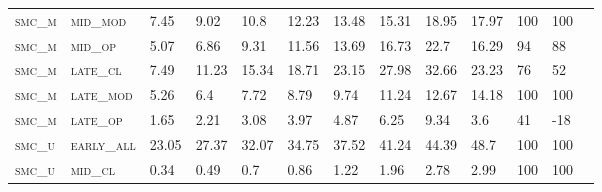 \begin{sidewaystable}[!htbp]
\begin{tabular}{@{}lllllllllllll@{}}
\footnotesize \textsc{smc\_m}      & \footnotesize \textsc{mid\_mod  }               & \footnotesize 7.45            & \footnotesize 9.02            & \footnotesize 10.8             & \footnotesize 12.23            & \footnotesize 13.48            & \footnotesize 15.31            & \footnotesize 18.95       & \footnotesize 17.97    & \footnotesize 100    & \footnotesize 100      \\
\footnotesize \textsc{smc\_m}      & \footnotesize \textsc{mid\_op   }               & \footnotesize 5.07            & \footnotesize 6.86            & \footnotesize 9.31             & \footnotesize 11.56            & \footnotesize 13.69            & \footnotesize 16.73            & \footnotesize 22.7        & \footnotesize 16.29    & \footnotesize 94     & \footnotesize 88       \\
\footnotesize \textsc{smc\_m}      & \footnotesize \textsc{late\_cl  }               & \footnotesize 7.49            & \footnotesize 11.23           & \footnotesize 15.34            & \footnotesize 18.71            & \footnotesize 23.15            & \footnotesize 27.98            & \footnotesize 32.66       & \footnotesize 23.23    & \footnotesize 76     & \footnotesize 52       \\
\footnotesize \textsc{smc\_m}      & \footnotesize \textsc{late\_mod }               & \footnotesize 5.26            & \footnotesize 6.4             & \footnotesize 7.72             & \footnotesize 8.79             & \footnotesize 9.74             & \footnotesize 11.24            & \footnotesize 12.67       & \footnotesize 14.18    & \footnotesize 100    & \footnotesize 100      \\
\footnotesize \textsc{smc\_m}      & \footnotesize \textsc{late\_op  }               & \footnotesize 1.65            & \footnotesize 2.21            & \footnotesize 3.08             & \footnotesize 3.97             & \footnotesize 4.87             & \footnotesize 6.25             & \footnotesize 9.34        & \footnotesize 3.6      & \footnotesize 41     & \footnotesize -18      \\
\footnotesize \textsc{smc\_u}      & \footnotesize \textsc{early\_all}               & \footnotesize 23.05           & \footnotesize 27.37           & \footnotesize 32.07            & \footnotesize 34.75            & \footnotesize 37.52            & \footnotesize 41.24            & \footnotesize 44.39       & \footnotesize 48.7     & \footnotesize 100    & \footnotesize 100      \\
\footnotesize \textsc{smc\_u}      & \footnotesize \textsc{mid\_cl   }               & \footnotesize 0.34            & \footnotesize 0.49            & \footnotesize 0.7              & \footnotesize 0.86             & \footnotesize 1.22             & \footnotesize 1.96             & \footnotesize 2.78        & \footnotesize 2.99     & \footnotesize 100    & \footnotesize 100      \\

\end{tabular}
\end{sidewaystable}
